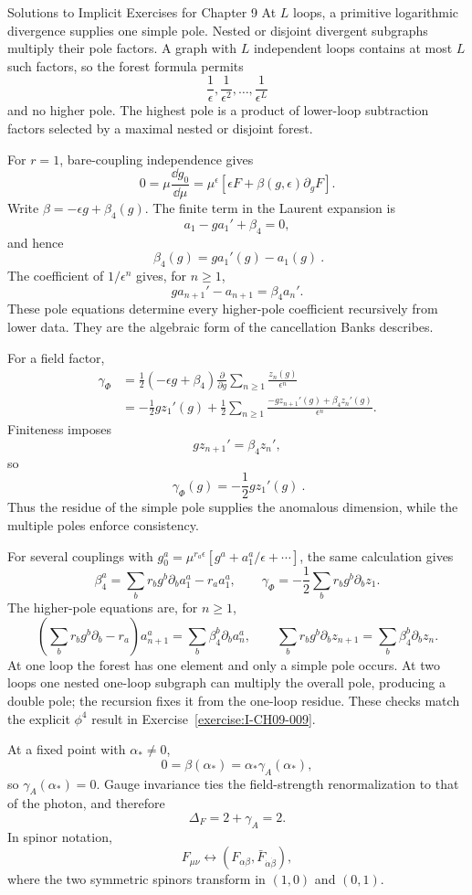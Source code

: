 \begin{bankssolutions}{Solutions to Implicit Exercises for Chapter 9}
At $L$ loops, a primitive logarithmic divergence supplies one simple pole.
Nested or disjoint divergent subgraphs multiply their pole factors.  A graph
with $L$ independent loops contains at most $L$ such factors, so the forest
formula permits
\[
  \frac1\epsilon,\frac1{\epsilon^2},\ldots,\frac1{\epsilon^L}
\]
and no higher pole.  The highest pole is a product of lower-loop subtraction
factors selected by a maximal nested or disjoint forest.

For $r=1$, bare-coupling independence gives
\[
  0=\mu\frac{\dd g_0}{\dd\mu}
  =\mu^\epsilon\left[\epsilon F+\beta(g,\epsilon)\partial_gF\right].
\]
Write $\beta=-\epsilon g+\beta_4(g)$.  The finite term in the Laurent
expansion is
\[
  a_1-ga_1'+\beta_4=0,
\]
and hence
\[
  \boxed{\ \beta_4(g)=g a_1'(g)-a_1(g)\ }.
\]
The coefficient of $1/\epsilon^n$ gives, for $n\geq1$,
\[
  g a_{n+1}'-a_{n+1}=\beta_4 a_n'.
\]
These pole equations determine every higher-pole coefficient recursively from
lower data.  They are the algebraic form of the cancellation Banks describes.

For a field factor,
\begin{align*}
  \gamma_\Phi
  &=\frac12(-\epsilon g+\beta_4)
  \frac{\partial}{\partial g}
  \sum_{n\geq1}\frac{z_n(g)}{\epsilon^n}\\
  &=-\frac12g z_1'(g)
  +\frac12\sum_{n\geq1}\frac{
  -g z_{n+1}'(g)+\beta_4z_n'(g)}{\epsilon^n}.
\end{align*}
Finiteness imposes
\[
  g z_{n+1}'=\beta_4z_n',
\]
so
\[
  \boxed{\ \gamma_\Phi(g)=-\frac12g z_1'(g)\ }.
\]
Thus the residue of the simple pole supplies the anomalous dimension, while
the multiple poles enforce consistency.

For several couplings with
$g_0^a=\mu^{r_a\epsilon}[g^a+a_1^a/\epsilon+\cdots]$, the same calculation
gives
\[
  \beta_4^a=\sum_b r_b g^b\partial_ba_1^a-r_a a_1^a,
  \qquad
  \gamma_\Phi=-\frac12\sum_b r_bg^b\partial_bz_1.
\]
The higher-pole equations are, for $n\geq1$,
\[
  \left(\sum_b r_bg^b\partial_b-r_a\right)a_{n+1}^a
  =\sum_b\beta_4^b\partial_ba_n^a,
  \qquad
  \sum_b r_bg^b\partial_bz_{n+1}
  =\sum_b\beta_4^b\partial_bz_n.
\]
At one loop the forest has one element and only a simple pole occurs.  At two
loops one nested one-loop subgraph can multiply the overall pole, producing a
double pole; the recursion fixes it from the one-loop residue.  These checks
match the explicit $\phi^4$ result in Exercise~\ref{exercise:I-CH09-009}.

At a fixed point with $\alpha_*\ne0$,
\[
  0=\beta(\alpha_*)=\alpha_*\gamma_A(\alpha_*),
\]
so $\gamma_A(\alpha_*)=0$.  Gauge invariance ties the field-strength
renormalization to that of the photon, and therefore
\[
  \Delta_F=2+\gamma_A=2.
\]
In spinor notation,
\[
  F_{\mu\nu}\longleftrightarrow
  (F_{\alpha\beta},\bar F_{\dot\alpha\dot\beta}),
\]
where the two symmetric spinors transform in $(1,0)$ and $(0,1)$.


\end{bankssolutions}

